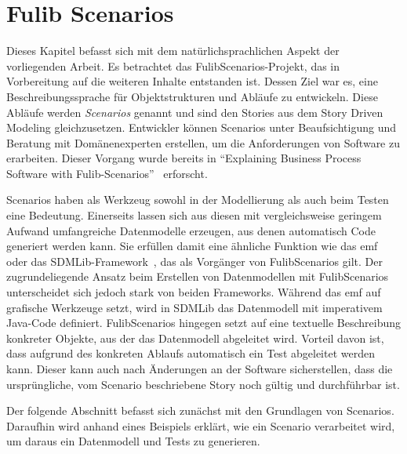 \chapter{Fulib Scenarios}\label{ch:fulib-scenarios}

Dieses Kapitel befasst sich mit dem natürlichsprachlichen Aspekt der vorliegenden Arbeit.
Es betrachtet das FulibScenarios-Projekt, das in Vorbereitung auf die weiteren Inhalte entstanden ist.
Dessen Ziel war es, eine Beschreibungssprache für Objektstrukturen und Abläufe zu entwickeln.
Diese Abläufe werden \emph{Scenarios} genannt und sind den Stories aus dem Story Driven Modeling gleichzusetzen.
Entwickler können Scenarios unter Beaufsichtigung und Beratung mit Domänenexperten erstellen, um die Anforderungen von Software zu erarbeiten.
Dieser Vorgang wurde bereits in ``Explaining Business Process Software with Fulib-Scenarios''~\cite{explain} erforscht.

Scenarios haben als Werkzeug sowohl in der Modellierung als auch beim Testen eine Bedeutung.
Einerseits lassen sich aus diesen mit vergleichsweise geringem Aufwand umfangreiche Datenmodelle erzeugen, aus denen automatisch Code generiert werden kann.
Sie erfüllen damit eine ähnliche Funktion wie das \ac{emf}~\cite{emf} oder das SDMLib-Framework~\cite{networkparser}, das als Vorgänger von FulibScenarios gilt.
Der zugrundeliegende Ansatz beim Erstellen von Datenmodellen mit FulibScenarios unterscheidet sich jedoch stark von beiden Frameworks.
Während das \ac{emf} auf grafische Werkzeuge setzt, wird in SDMLib das Datenmodell mit imperativem Java-Code definiert.
FulibScenarios hingegen setzt auf eine textuelle Beschreibung konkreter Objekte, aus der das Datenmodell abgeleitet wird.
Vorteil davon ist, dass aufgrund des konkreten Ablaufs automatisch ein Test abgeleitet werden kann.
Dieser kann auch nach Änderungen an der Software sicherstellen, dass die ursprüngliche, vom Scenario beschriebene Story noch gültig und durchführbar ist.

Der folgende Abschnitt befasst sich zunächst mit den Grundlagen von Scenarios.
Daraufhin wird anhand eines Beispiels erklärt, wie ein Scenario verarbeitet wird, um daraus ein Datenmodell und Tests zu generieren.




